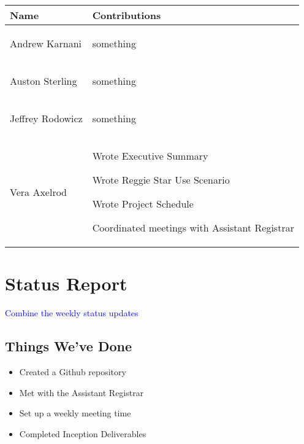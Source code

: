 \documentclass[11pt]{article}
\newenvironment{packed_itemize}{
\begin{itemize}
  \setlength{\itemsep}{1pt}
  \setlength{\parskip}{0pt}
  \setlength{\parsep}{0pt}
}{\end{itemize}}
\begin{document}
\begin{table}
\centering %
\begin{tabular}{|p{1.4in}|p{4in}|}
\hline
\textbf{Name}     & \textbf{Contributions} \\
\hline\hline
 Andrew Karnani
	& 
	 \begin{packed_itemize} 
	\vspace{-0.15in}
		\item something
	\end{packed_itemize}
	\vspace{-0.4in}
\\
\hline
 Auston Sterling
	& 
	 \begin{packed_itemize} 
	\vspace{-0.15in}
		\item something
	\end{packed_itemize}
	\vspace{-0.4in}
\\
\hline
Jeffrey Rodowicz
	& 
	 \begin{packed_itemize} 
	\vspace{-0.15in}
		\item something
	\end{packed_itemize}
	\vspace{-0.4in}
\\
\hline
Vera Axelrod
	& 
	 \begin{packed_itemize} 
	\vspace{-0.15in}
		\item Wrote Executive Summary 
		\item Wrote Reggie Star Use Scenario
		\item Wrote Project Schedule
		\item Coordinated meetings with Assistant Registrar
	\end{packed_itemize}
	\vspace{-0.4in}
\\
\hline
\end{tabular}
\end{table}


\section{Status Report} %
\textcolor{blue}{Combine the weekly status updates}
\subsection{Things We've Done}
\begin{itemize}
\item Created a Github repository
\item Met with the Assistant Registrar
\item Set up a weekly meeting time
\item Completed Inception Deliverables
\end{itemize}
\end{document}
